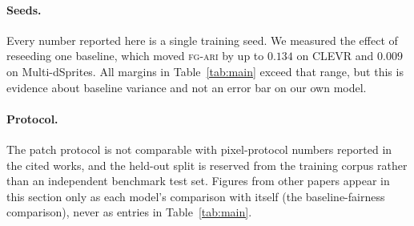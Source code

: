 \paragraph{Seeds.}
Every number reported here is a single training seed. We measured the effect of reseeding one
baseline, which moved \textsc{fg-ari} by up to $0.134$ on CLEVR and $0.009$ on Multi-dSprites. All
margins in Table~\ref{tab:main} exceed that range, but this is evidence about baseline variance
and not an error bar on our own model.

\paragraph{Protocol.}
The patch protocol is not comparable with pixel-protocol numbers reported in the cited works, and
the held-out split is reserved from the training corpus rather than an independent benchmark test
set. Figures from other papers appear in this section only as each model's comparison with itself
(the baseline-fairness comparison), never as entries in Table~\ref{tab:main}.
